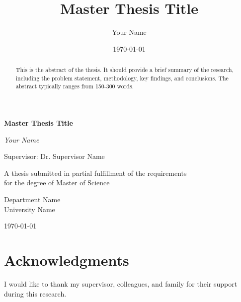 \documentclass[12pt,a4paper,oneside]{report}
\title{Master Thesis Title}
\author{Your Name}
\date{\today}
\begin{document}
\begin{titlepage}
    \centering
    \vspace*{2cm}
    
    {\huge\bfseries Master Thesis Title\par}
    \vspace{2cm}
    
    {\Large\itshape Your Name\par}
    \vspace{1cm}
    
    {\large Supervisor: Dr. Supervisor Name\par}
    \vspace{2cm}
    
    {\large A thesis submitted in partial fulfillment of the requirements\\
    for the degree of Master of Science\par}
    \vspace{1cm}
    
    {\large Department Name\\
    University Name\par}
    \vspace{1cm}
    
    {\large \today\par}
\end{titlepage}

\begin{abstract}
This is the abstract of the thesis. It should provide a brief summary of the research, including the problem statement, methodology, key findings, and conclusions. The abstract typically ranges from 150-300 words.
\end{abstract}

\chapter*{Acknowledgments}
I would like to thank my supervisor, colleagues, and family for their support during this research.

\tableofcontents

\listoffigures
{}

\listoftables
{}











\appendix

\end{document}
